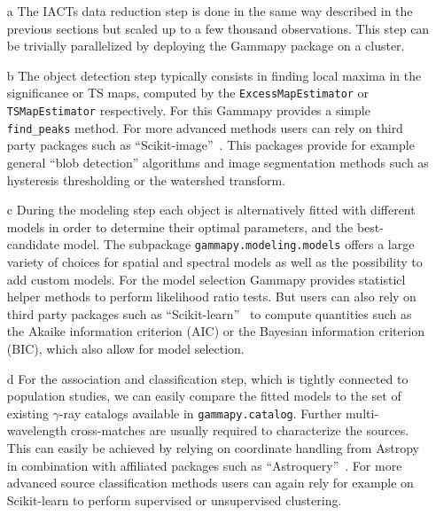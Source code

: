 \documentclass[longauth]{aa}
\newcommand{\code}[1]{\texttt{#1}}
\newcommand{\gammapy}{Gammapy\xspace}
\newcommand{\iacts}{IACTs\xspace}
\newcommand{\gammaray}{$\gamma$-ray\xspace}
\begin{document}
\begin{itemize}
        \item[a] The \iacts data reduction step is done in the same way described in the 
        previous sections but scaled up to a few thousand observations. This step can be
        trivially parallelized by deploying the \gammapy package on a cluster.
        \item[b] The object detection step typically consists in finding local maxima
        in the significance or TS maps, computed by the \code{ExcessMapEstimator} or
        \code{TSMapEstimator} respectively. For this \gammapy provides a simple \code{find\_peaks}
        method. For more advanced methods users can rely on third party packages such as
        \enquote{Scikit-image}~\citep{scikit-image}. This packages provide for example general
        \enquote{blob detection} algorithms and image segmentation methods such as hysteresis thresholding
        or the watershed transform.     
        \item[c] During the modeling step each object is alternatively fitted with different
        models in order to determine their optimal parameters, and the best-candidate model. The
        subpackage \code{gammapy.modeling.models} offers a large variety of choices for spatial
        and spectral models as well as the possibility to add custom models. For the model selection
        \gammapy provides statisticl helper methods to perform likelihood ratio tests.
        But users can also rely on third party packages such as \enquote{Scikit-learn}~\citep{scikit-learn}
        to compute quantities such as the Akaike information criterion (AIC) or the Bayesian
        information criterion (BIC), which also allow for model selection.
        \item[d] For the association and classification step, which is tightly connected to
        population studies, we can easily compare the fitted models to the set of
        existing \gammaray catalogs available in \code{gammapy.catalog}. Further
        multi-wavelength cross-matches are usually required to characterize the
        sources. This can easily be achieved by relying on coordinate
        handling from Astropy in combination with affiliated packages such as
        \enquote{Astroquery}~\citep{astroquery}. For more advanced source classification
        methods users can again rely for example on Scikit-learn to perform supervised
        or unsupervised clustering.
\end{itemize}
\end{document}
